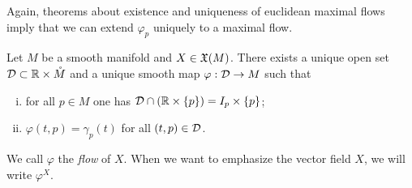 Again, theorems about existence and uniqueness of euclidean maximal flows imply that we can extend $\varphi_p$ uniquely to a maximal flow.

\begin{theorem} %
  \label{thm:exuniqmax}
  Let $M$ be a smooth manifold and $X\in\mathfrak{X}(M)$.
  There exists a unique open set $\mathcal{D} \subset \mathbb{R}\times\mathring M$ and a unique smooth map $\varphi:\mathcal{D}\to M$ such that
  \begin{enumerate}[(i)]
    \item\label{thm:exuniqmax:i} for all $p\in M$ one has $\mathcal{D}\cap(\mathbb{R}\times\{p\}) = I_p\times\{p\}$;
    \item\label{thm:exuniqmax:ii} $\varphi(t,p) = \gamma_p(t)$ for all $(t,p)\in\mathcal{D}$.
  \end{enumerate}
\end{theorem}

We call $\varphi$ the \emph{flow} of $X$.
When we want to emphasize the vector field $X$, we will write $\varphi^X$.

